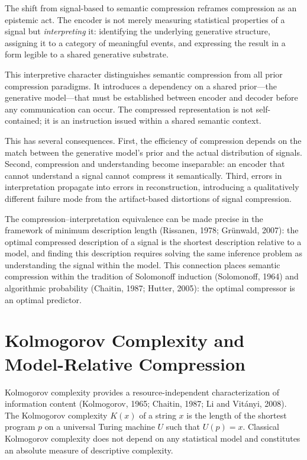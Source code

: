 \documentclass[11pt,a4paper]{article}
\theoremstyle{definition}
\theoremstyle{remark}
\begin{document}
The shift from signal-based to semantic compression reframes compression as an epistemic act. The encoder is not merely measuring statistical properties of a signal but \emph{interpreting} it: identifying the underlying generative structure, assigning it to a category of meaningful events, and expressing the result in a form legible to a shared generative substrate.

This interpretive character distinguishes semantic compression from all prior compression paradigms. It introduces a dependency on a shared prior---the generative model---that must be established between encoder and decoder before any communication can occur. The compressed representation is not self-contained; it is an instruction issued within a shared semantic context.

This has several consequences. First, the efficiency of compression depends on the match between the generative model's prior and the actual distribution of signals. Second, compression and understanding become inseparable: an encoder that cannot understand a signal cannot compress it semantically. Third, errors in interpretation propagate into errors in reconstruction, introducing a qualitatively different failure mode from the artifact-based distortions of signal compression.

The compression--interpretation equivalence can be made precise in the framework of minimum description length (Rissanen, 1978; Gr\"{u}nwald, 2007): the optimal compressed description of a signal is the shortest description relative to a model, and finding this description requires solving the same inference problem as understanding the signal within the model. This connection places semantic compression within the tradition of Solomonoff induction (Solomonoff, 1964) and algorithmic probability (Chaitin, 1987; Hutter, 2005): the optimal compressor is an optimal predictor.

\section{Kolmogorov Complexity and Model-Relative Compression}
\label{sec:kolmogorov}

Kolmogorov complexity provides a resource-independent characterization of information content (Kolmogorov, 1965; Chaitin, 1987; Li and Vit\'{a}nyi, 2008). The Kolmogorov complexity $K(x)$ of a string $x$ is the length of the shortest program $p$ on a universal Turing machine $U$ such that $U(p) = x$. Classical Kolmogorov complexity does not depend on any statistical model and constitutes an absolute measure of descriptive complexity.
\end{document}
